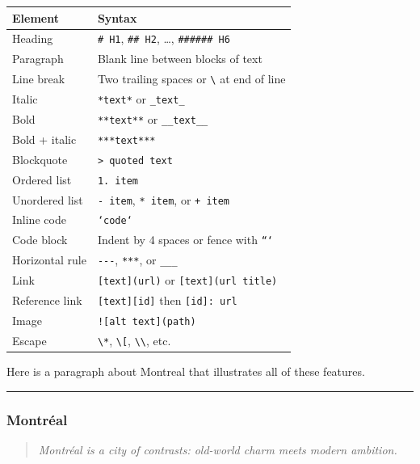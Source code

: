 \documentclass[11pt]{article}
\begin{document}
\begin{tabular}{ll}
\hline
Element & Syntax \\
\hline
Heading & \texttt{\# H1}, \texttt{\#\# H2}, \ldots{}, \texttt{\#\#\#\#\#\# H6} \\
Paragraph & Blank line between blocks of text \\
Line break & Two trailing spaces or \texttt{\textbackslash{}} at end of line \\
Italic & \texttt{*text*} or \texttt{\_text\_} \\
Bold & \texttt{**text**} or \texttt{\_\_text\_\_} \\
Bold + italic & \texttt{***text***} \\
Blockquote & \texttt{\textgreater{} quoted text} \\
Ordered list & \texttt{1. item} \\
Unordered list & \texttt{- item}, \texttt{* item}, or \texttt{+ item} \\
Inline code & \texttt{`code`} \\
Code block & Indent by 4 spaces or fence with \texttt{```} \\
Horizontal rule & \texttt{-{}-{}-}, \texttt{***}, or \texttt{\_\_\_} \\
Link & \texttt{{[}text{]}(url)} or \texttt{{[}text{]}(url \textquotedbl{}title\textquotedbl{})} \\
Reference link & \texttt{{[}text{]}{[}id{]}} then \texttt{{[}id{]}: url} \\
Image & \texttt{!{[}alt text{]}(path)} \\
Escape & \texttt{\textbackslash{}*}, \texttt{\textbackslash{}{[}}, \texttt{\textbackslash{}\textbackslash{}}, etc. \\
\hline
\end{tabular}

Here is a paragraph about Montreal that illustrates all of these features.


\begin{center}\rule{0.5\linewidth}{\linethickness}\end{center}

\subsubsection*{Montréal}
\label{montréal}

\begin{quote}
\emph{Montréal is a city of contrasts: old-world charm meets modern ambition.}

\end{quote}
\end{document}
